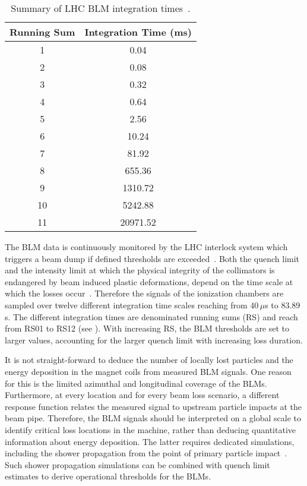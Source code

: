 \begin{table}[b]
\centering
\caption{Summary of LHC BLM integration times~\cite{DIPAC05:POW019}.}
\label{tab:RS}
\small
\begin{tabular}{cc} \toprule
Running Sum & Integration Time (ms) \\ \midrule
1           & 0.04                  \\
2           & 0.08                  \\
3           & 0.32                  \\
4           & 0.64                  \\
5           & 2.56                  \\
6           & 10.24                 \\
7           & 81.92                 \\
8           & 655.36                \\
9           & 1310.72               \\
10          & 5242.88               \\
11          & 20971.52              \\ \bottomrule
\end{tabular}
\end{table}

The BLM data is continuously monitored by the LHC interlock system which triggers a beam dump if defined thresholds are exceeded~\cite{guaglio2005reliability}. Both the quench limit and the intensity limit at which the physical integrity of the collimators is endangered by beam induced plastic deformations, depend on the time scale at which the losses occur~\cite{bertarelli:chamonix11,BIQ14:Redaelli}. Therefore the signals of the ionization chambers are sampled over twelve different integration time scales reaching from 40\,$\mu$s to $83.89\,$s. The different integration times are denominated running sums (RS) and reach from RS01 to RS12 (see ). With increasing RS, the BLM thresholds are set to larger values, accounting for the larger quench limit with increasing loss duration. 

It is not straight-forward to deduce the number of locally lost particles and the energy deposition in the magnet coils from measured BLM signals. One reason for this is the limited azimuthal and longitudinal coverage of the BLMs. Furthermore, at every location and for every beam loss scenario, a different response function relates the measured signal to upstream particle impacts at the beam pipe. Therefore, the BLM signals should be interpreted on a global scale to identify critical loss locations in the machine, rather than deducing quantitative information about energy deposition. The latter requires dedicated simulations, including the shower propagation from the point of primary particle impact~\cite{PAC09:TH5RFP035,Bruce2014a,PhysRevSTAB.18.061002}. Such shower propagation simulations can be combined with quench limit estimates to derive operational thresholds for the BLMs.

